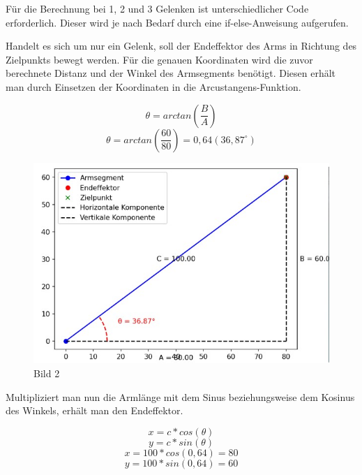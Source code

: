 \documentclass[12pt]{article}
\begin{document}
    


    Für die Berechnung bei 1, 2 und 3 Gelenken ist unterschiedlicher Code erforderlich. Dieser wird je
    nach Bedarf durch eine if-else-Anweisung aufgerufen.

    Handelt es sich um nur ein Gelenk, soll der Endeffektor des Arms in Richtung des Zielpunkts
    bewegt werden. Für die genauen Koordinaten wird die zuvor berechnete Distanz und der Winkel des
    Armsegments benötigt. Diesen erhält man durch Einsetzen der Koordinaten in die
    Arcustangens-Funktion.

    \[
        \theta=arctan(\frac{B}{A})
    \]
    \[
        \theta=arctan(\frac{60}{80})=0,64 (36,87^\circ)
    \]

    \begin{figure}[h]
        \centering
        \includegraphics[width = \linewidth]{Bild 2}
        \caption{Bild 2}
    \end{figure}

    

    Multipliziert man nun die Armlänge mit dem Sinus beziehungsweise dem Kosinus des Winkels, erhält
    man den Endeffektor.

    \[
        x=c * cos(\theta)
    \]
    \[
        y=c * sin(\theta)
    \]
    \[
        x=100 * cos(0,64)=80
    \]
    \[
        y=100 * sin(0,64)=60
    \]

    
\end{document}
